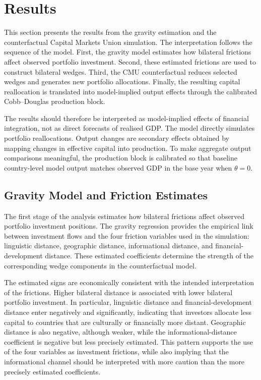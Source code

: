 
\section{Results}
\label{sec:results}

This section presents the results from the gravity estimation and the counterfactual Capital Markets Union simulation. The interpretation follows the sequence of the model. First, the gravity model estimates how bilateral frictions affect observed portfolio investment. Second, these estimated frictions are used to construct bilateral wedges. Third, the CMU counterfactual reduces selected wedges and generates new portfolio allocations. Finally, the resulting capital reallocation is translated into model-implied output effects through the calibrated Cobb--Douglas production block.

The results should therefore be interpreted as model-implied effects of financial integration, not as direct forecasts of realised GDP. The model directly simulates portfolio reallocations. Output changes are secondary effects obtained by mapping changes in effective capital into production. To make aggregate output comparisons meaningful, the production block is calibrated so that baseline country-level model output matches observed GDP in the base year when $\theta=0$.

\subsection{Gravity Model and Friction Estimates}
\label{sec:results_gravity}

The first stage of the analysis estimates how bilateral frictions affect observed portfolio investment positions. The gravity regression provides the empirical link between investment flows and the four friction variables used in the simulation: linguistic distance, geographic distance, informational distance, and financial-development distance. These estimated coefficients determine the strength of the corresponding wedge components in the counterfactual model.

The estimated signs are economically consistent with the intended interpretation of the frictions. Higher bilateral distance is associated with lower bilateral portfolio investment. In particular, linguistic distance and financial-development distance enter negatively and significantly, indicating that investors allocate less capital to countries that are culturally or financially more distant. Geographic distance is also negative, although weaker, while the informational-distance coefficient is negative but less precisely estimated. This pattern supports the use of the four variables as investment frictions, while also implying that the informational channel should be interpreted with more caution than the more precisely estimated coefficients.

